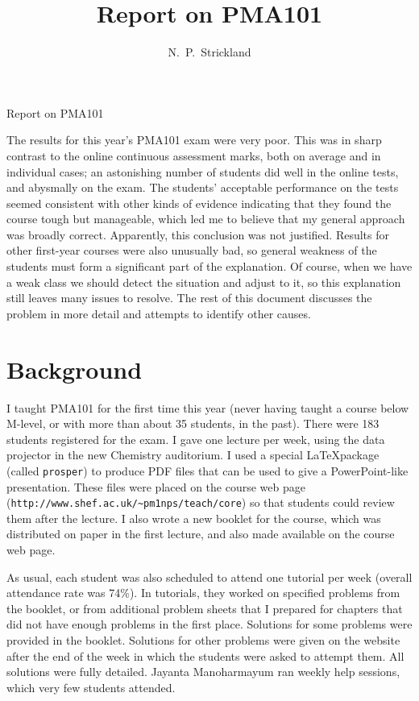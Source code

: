 \documentclass{amsart}
\begin{document}
\title{Report on PMA101}
\author{N.~P.~Strickland}


\vspace{-14ex}
\begin{center}
 {\Huge Report on PMA101}
\end{center}
\vspace{2ex}

The results for this year's PMA101 exam were very poor.  This was in
sharp contrast to the online continuous assessment marks, both on
average and in individual cases; an astonishing number of students did
well in the online tests, and abysmally on the exam.  The students'
acceptable performance on the tests seemed consistent with other kinds
of evidence indicating that they found the course tough but
manageable, which led me to believe that my general approach was
broadly correct.  Apparently, this conclusion was not justified.
Results for other first-year courses were also unusually bad, so
general weakness of the students must form a significant part of the
explanation.  Of course, when we have a weak class we should detect
the situation and adjust to it, so this explanation still leaves many
issues to resolve.  The rest of this document discusses the problem in
more detail and attempts to identify other causes.

\section*{Background}

I taught PMA101 for the first time this year (never having taught a
course below M-level, or with more than about 35 students, in the
past).  There were 183 students registered for the exam.  I gave one
lecture per week, using the data projector in the new Chemistry
auditorium.  I used a special \LaTeX package (called \verb+prosper+)
to produce PDF files that can be used to give a PowerPoint-like
presentation.  These files were placed on the course web page
(\verb+http://www.shef.ac.uk/~pm1nps/teach/core+) so that students
could review them after the lecture.  I also wrote a new booklet for
the course, which was distributed on paper in the first lecture, and
also made available on the course web page.

As usual, each student was also scheduled to attend one tutorial per
week (overall attendance rate was 74\%).  In tutorials, they worked on
specified problems from the booklet, or from additional problem sheets
that I prepared for chapters that did not have enough problems in the
first place.  Solutions for some problems were provided in the
booklet.  Solutions for other problems were given on the website after
the end of the week in which the students were asked to attempt them.
All solutions were fully detailed.  Jayanta Manoharmayum ran weekly
help sessions, which very few students attended.
\end{document}
